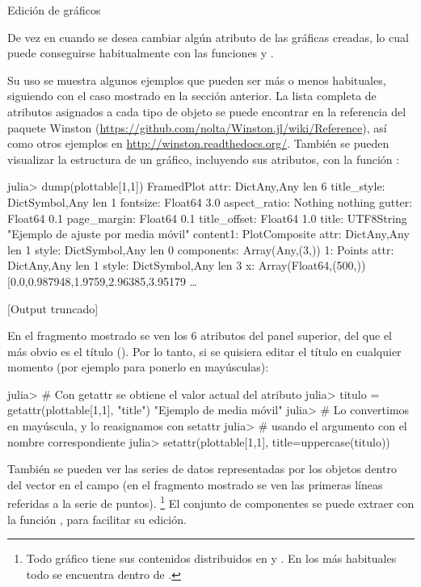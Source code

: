 ﻿\documentclass[spanish]{article}
\begin{document}
Edición de gráficos

De vez en cuando se desea cambiar algún atributo de las gráficas creadas, lo cual puede conseguirse habitualmente con las funciones  y .

Su uso se muestra algunos ejemplos que pueden ser más o menos habituales, siguiendo con el caso mostrado en la sección anterior. La lista completa de atributos asignados a cada tipo de objeto se puede encontrar en la referencia del paquete Winston (\url{https://github.com/nolta/Winston.jl/wiki/Reference}), así como otros ejemplos en \url{http://winston.readthedocs.org/}. También se pueden visualizar la estructura de un gráfico, incluyendo sus atributos, con la función :
 
julia> dump(plottable[1,1])
FramedPlot 
  attr: Dict{Any,Any} len 6
    title_style: Dict{Symbol,Any} len 1
      fontsize: Float64 3.0
    aspect_ratio: Nothing nothing
    gutter: Float64 0.1
    page_margin: Float64 0.1
    title_offset: Float64 1.0
    title: UTF8String "Ejemplo de ajuste por media móvil"
  content1: PlotComposite 
    attr: Dict{Any,Any} len 1
      style: Dict{Symbol,Any} len 0
    components: Array(Any,(3,))
      1: Points 
        attr: Dict{Any,Any} len 1
          style: Dict{Symbol,Any} len 3
        x: Array(Float64,(500,)) [0.0,0.987948,1.9759,2.96385,3.95179 …  

[Output truncado]

En el fragmento mostrado se ven los 6 atributos del panel superior, del que el más obvio es el título (). Por lo tanto, si se quisiera editar el título en cualquier momento (por ejemplo para ponerlo en mayúsculas):

julia> # Con getattr se obtiene el valor actual del atributo
julia> titulo = getattr(plottable[1,1], "title")
"Ejemplo de media móvil"
julia> # Lo convertimos en mayúscula, y lo reasignamos con setattr
julia> # usando el argumento con el nombre correspondiente
julia> setattr(plottable[1,1], title=uppercase(titulo))

También se pueden ver las series de datos representadas por los objetos dentro del vector  en el campo  (en el fragmento mostrado se ven las primeras líneas referidas a la serie de puntos).%
\footnote{%
Todo gráfico tiene sus contenidos distribuidos en  y
. En los más habituales todo se encuentra dentro de
.%
} 
El conjunto de componentes se puede extraer con la función , para facilitar su edición.
\end{document}
